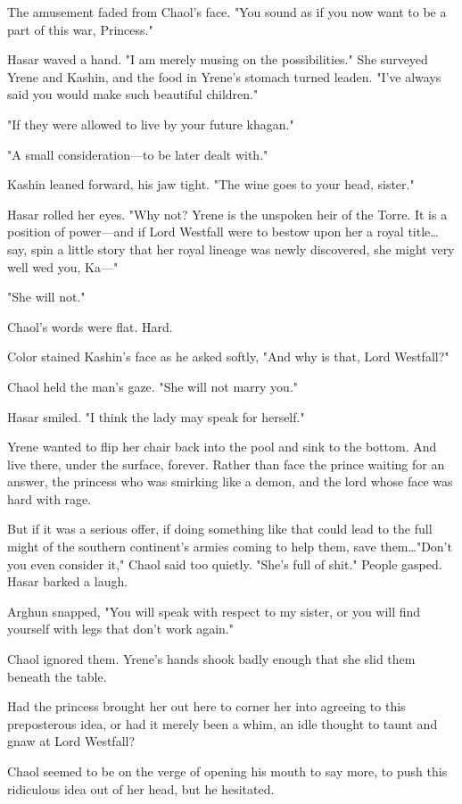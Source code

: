 The amusement faded from Chaol's face.
"You sound as if you now want to be a part of this war, Princess."

Hasar waved a hand.
"I am merely musing on the possibilities."
She surveyed Yrene and Kashin, and the food in Yrene's stomach turned leaden.
"I've always said you would make such beautiful children."

"If they were allowed to live by your future khagan."

"A small consideration---to be later dealt with."

Kashin leaned forward, his jaw tight.
"The wine goes to your head, sister."

Hasar rolled her eyes.
"Why not?
Yrene is the unspoken heir of the Torre.
It is a position of power---and if Lord Westfall were to bestow upon her a royal title\ldots say, spin a little story that her royal lineage was newly discovered, she might very well wed you, Ka---"

"She will not."

Chaol's words were flat.
Hard.

Color stained Kashin's face as he asked softly, "And why is that, Lord Westfall?"

Chaol held the man's gaze.
"She will not marry you."

Hasar smiled.
"I think the lady may speak for herself."

Yrene wanted to flip her chair back into the pool and sink to the bottom.
And live there, under the surface, forever.
Rather than face the prince waiting for an answer, the princess who was smirking like a demon, and the lord whose face was hard with rage.

But if it was a serious offer, if doing something like that could lead to the full might of the southern continent's armies coming to help them, save them\ldots "Don't you even consider it," Chaol said too quietly.
"She's full of shit."
People gasped.
Hasar barked a laugh.

Arghun snapped, "You will speak with respect to my sister, or you will find yourself with legs that don't work again."

Chaol ignored them.
Yrene's hands shook badly enough that she slid them beneath the table.

Had the princess brought her out here to corner her into agreeing to this preposterous idea, or had it merely been a whim, an idle thought to taunt and gnaw at Lord Westfall?

Chaol seemed to be on the verge of opening his mouth to say more, to push this ridiculous idea out of her head, but he hesitated.

